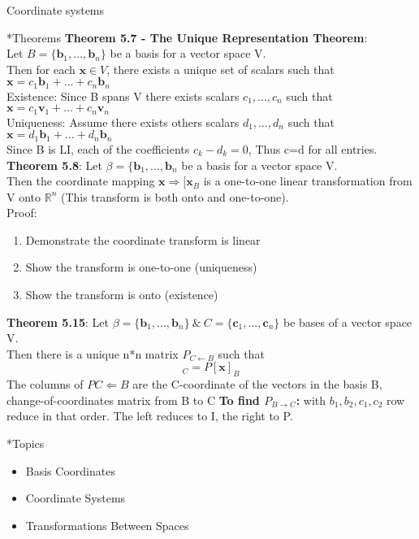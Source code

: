 \documentclass[a4paper, 12pt]{article}
\begin{document}
\begin{section}{Coordinate systems}
\begin{subsection}*{Theorems}
\textbf{Theorem 5.7 - The Unique Representation Theorem}:\\
Let $B=\{\textbf{b}_{1},\dots,\textbf{b}_{n}\}$ be a basis for a vector space V.\\
Then for each $\textbf{x} \in V$, there exists a unique set of scalars such that
$\textbf{x}=c_1\textbf{b}_1+\dots+c_{n}\textbf{b}_{n}$\\
Existence: Since B spans V there exists scalars $c_1,\dots,c_{n}$ such that 
$\textbf{x}=c_1\textbf{v}_{1}+\dots+c_{n}\textbf{v}_{n}$\\
Uniqueness: Assume there exists others scalars $d_1,\dots,d_{n}$ such that 
$\textbf{x}=d_1\textbf{b}_{1}+\dots+d_{n}\textbf{b}_{n}$\\
Since B is LI, each of the coefficients $c_{k}-d_{k}=0$, Thus c=d for all entries.
\\ \noindent \textbf{Theorem 5.8}: Let $\beta=\{\textbf{b}_{1},\dots,\textbf{b}_{n}$
be a basis for a vector space V.\\
Then the coordinate mapping $\textbf{x}\Rightarrow [\textbf{x}_{B}$ is a
one-to-one linear transformation from V onto $\mathbb{R}^{n}$ (This transform is 
both onto and one-to-one). \\
Proof:
\begin{enumerate}
\item{Demonstrate the coordinate transform is linear}
\item{Show the transform is one-to-one (uniqueness)}
\item{Show the transform is onto (existence)}
\end{enumerate}
\noindent \textbf{Theorem 5.15}: Let $\beta=\{\textbf{b}_{1},\dots,\textbf{b}_{n}
\} ~\& ~ C=\{\textbf{c}_{1},\dots,\textbf{c}_{n}\}$ be bases of a vector space V.\\
Then there is a unique n*n matrix $P_{C\gets B}$ such that 
\begin{equation}
	[\textbf{x}]_{C}=P[\textbf{x}]_{B}
\end{equation}
The columns of $P C \Leftarrow B$ are the C-coordinate of the vectors in the 
basis B, change-of-coordinates matrix from B to C 
\textbf{To find $P_{B\to C}$:} with $b_1,b_2,c_1,c_2$ row reduce in that order. The
left reduces to I, the right to P. 
\end{subsection}
\begin{subsection}*{Topics}
\begin{itemize}
\item{Basis Coordinates}
\item{Coordinate Systems}
\item{Transformations Between Spaces}


\end{itemize}
\end{subsection}
\end{section}
\end{document}
